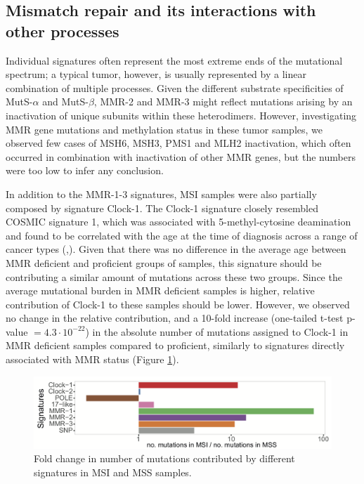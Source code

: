 
\subsection{Mismatch repair and its interactions with other processes}

Individual signatures often represent the most extreme ends of the mutational spectrum; 
a typical tumor, however, is usually represented by a linear combination of multiple processes. 
Given the different substrate specificities of MutS-$\alpha$ and MutS-$\beta$, 
MMR-2 and MMR-3 might reflect mutations arising by an inactivation of unique subunits within 
these heterodimers. However, investigating MMR gene mutations and methylation status 
in these tumor samples, we observed few cases of MSH6, MSH3, PMS1 and MLH2 inactivation, which 
often occurred in combination with inactivation of other MMR genes, but the numbers were
too low to infer any conclusion.

In addition to the MMR-1-3 signatures, MSI samples were also partially composed by signature
Clock-1. The Clock-1 signature closely resembled COSMIC signature 1, which was associated with 
5-methyl-cytosine deamination and found to be correlated with the age at the time of diagnosis 
across a range of cancer types (\cite{Alexandrov2013-md},\cite{Alexandrov2015-clock}). Given that there was no difference in the 
average age between MMR deficient and proficient groups of samples, this signature should be
contributing a similar amount of mutations across these two groups. Since the average mutational 
burden in MMR deficient samples is higher, relative contribution of Clock-1 to these samples 
should be lower. However, we observed no change in the relative contribution, and a 10-fold
increase (one-tailed t-test p-value $= 4.3 \cdot 10^{-22}$) in the absolute number of 
mutations assigned to Clock-1 in MMR deficient samples compared to proficient, 
similarly to signatures directly associated with MMR status (Figure \ref{clock1}).

\begin{figure}[h]
  \centering
  \centerline{\includegraphics[width=1\textwidth]{figures/clock1_in_MSI.png}}
  \caption{Fold change in number of mutations contributed by different signatures in MSI and MSS samples.}
  \label{clock1}
\end{figure}


